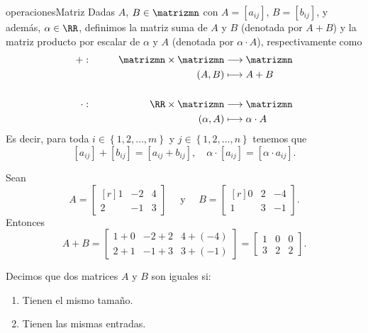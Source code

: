 \begin{definicion}{}{operacionesMatriz}
    Dadas $A$, $B \in \matrizmn$ con $A = [ a_{ij} ]$, $B = [ b_{ij} ]$, y además, $\alpha \in \RR$, definimos la matriz suma de $A$ y $B$ (denotada por $A + B$) y la matriz producto por escalar de $\alpha$ y $A$ (denotada por $\alpha \cdot A$), respectivamente como
    \begin{alignat*}{2}
        + & : & \qquad \matrizmn \times \matrizmn & \longrightarrow \matrizmn \\
        & & (A, B) & \longmapsto A + B \\
        & \\
        \cdot & : & \qquad \RR \times \matrizmn & \longrightarrow \matrizmn \\
        & & (\alpha, A) & \longmapsto \alpha \cdot A
    \end{alignat*}
    Es decir, para toda $i \in \left\{ 1, 2, \dots, m \right\}$ y $j \in \left\{ 1, 2, \dots, n \right\}$ tenemos que
    $$[ a_{ij} ] + [ b_{ij} ] = [ a_{ij} + b_{ij} ], \quad \alpha \cdot [ a_{ij} ] = [ \alpha \cdot a_{ij} ].$$
\end{definicion}

\begin{examplebox}{}{}
    Sean
    $$A = \begin{bmatrix*}[r]
        1 & -2 & 4 \\
        2 & -1 & 3
    \end{bmatrix*} \quad \text{ y } \quad B = \begin{bmatrix*}[r]
        0 & 2 & -4 \\
        1 & 3 & -1
    \end{bmatrix*}.$$
    Entonces
    $$A + B = \begin{bmatrix}
        1 + 0 & -2 + 2 & 4 + (-4) \\
        2 + 1 & -1 + 3 & 3 + (-1)
    \end{bmatrix} = \begin{bmatrix}
        1 & 0 & 0 \\
        3 & 2 & 2
    \end{bmatrix}.$$
\end{examplebox}

\newpage

\begin{definicion}{}{}
    Decimos que dos matrices $A$ y $B$ son iguales si:
    \begin{enumerate}[label=\roman*), topsep=6pt, itemsep=0pt]
        \item Tienen el mismo tamaño.
        \item Tienen las mismas entradas.
    \end{enumerate}
\end{definicion}


